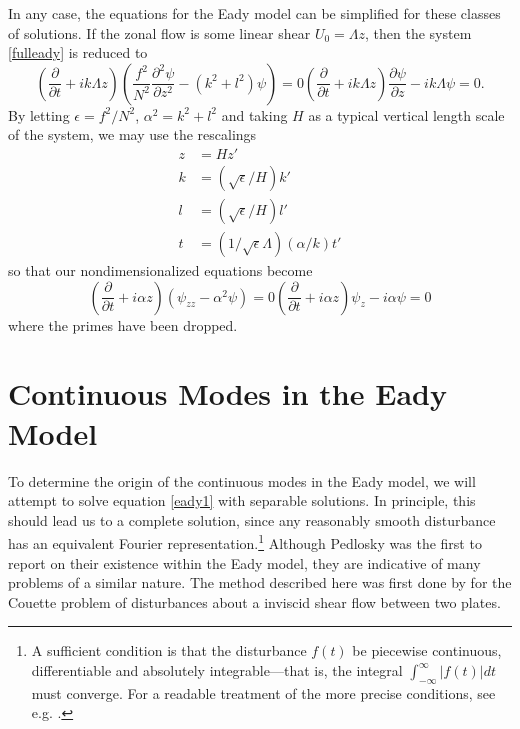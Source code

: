 \documentclass[letterpaper,11pt,onecolumn,twoside,titlepage]{article}
\newcommand{\pdiff}[2]{\frac{\partial #1}{\partial #2}}
\begin{document}
In any case, the equations for the Eady model can be simplified for these classes of solutions. If the zonal flow is some linear shear $U_0 = \Lambda z$, then the system \eqref{fulleady} is reduced to
\begin{subequations}
\begin{equation}\label{dimeady1}
\left(\frac{\partial}{\partial t} + i k \Lambda z\right)\left(\frac{f^2}{N^2} \frac{\partial^2 \psi}{\partial z^2} - \left(k^2+l^2\right) \psi\right) = 0
\end{equation}
\begin{equation}\label{dimeady2}
\left(\frac{\partial}{\partial t} + i k \Lambda z\right)\frac{\partial \psi}{\partial z} - i k \Lambda \psi = 0.
\end{equation}
\end{subequations}
By letting $\epsilon = f^2/N^2$, $\alpha^2 = k^2 + l^2$ and taking $H$ as a typical vertical length scale of the system, we may use the rescalings
\[
\begin{aligned}
z & = H z' \\
k & = \left(\sqrt{\epsilon} / H\right) k' \\
l & = \left(\sqrt{\epsilon} / H\right) l' \\
t & = \left(1 / \sqrt{\epsilon} \Lambda \right) \left(\alpha / k\right) t'
\end{aligned}
\]
so that our nondimensionalized equations become
\begin{subequations}
\begin{equation}\label{eady1}
\left(\pdiff{}{t} + i \alpha z\right)\left(\psi_{zz} - \alpha^2 \psi\right) = 0
\end{equation}
\begin{equation}\label{eady2}
\left(\pdiff{}{t} + i \alpha z\right)\psi_z - i \alpha \psi = 0
\end{equation}
\end{subequations}
where the primes have been dropped.


\section{Continuous Modes in the Eady Model}

To determine the origin of the continuous modes in the Eady model, we will attempt to solve equation \eqref{eady1} with separable solutions. In principle, this should lead us to a complete solution, since any reasonably smooth disturbance has an equivalent Fourier representation.\footnote{A sufficient condition is that the disturbance $f(t)$ be piecewise continuous, differentiable and absolutely integrable---that is, the integral $\int_{-\infty}^{\infty} |f(t)| dt$ must converge. For a readable treatment of the more precise conditions, see e.g. \citet{Lepage:1961}.} Although Pedlosky was the first to report on their existence within the Eady model, they are indicative of many problems of a similar nature. The method described here was first done by \citet{Case:1960} for the Couette problem of disturbances about a inviscid shear flow between two plates.
\end{document}
